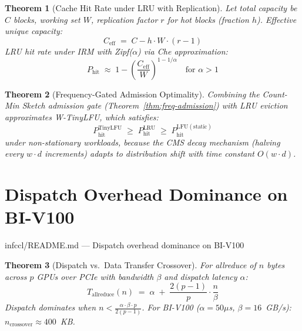\documentclass[11pt,a4paper,twoside]{article}
\theoremstyle{plain}
\newtheorem{theorem}{Theorem}[section]
\theoremstyle{definition}
\theoremstyle{remark}
\begin{document}
\begin{theorem}[Cache Hit Rate under LRU with Replication]
\label{thm:cache-hit}
Let total capacity be $C$ blocks, working set $W$, replication factor $r$ for hot
blocks (fraction $h$).  Effective unique capacity:
\begin{equation}
  C_{\text{eff}} \;=\; C - h \cdot W \cdot (r - 1)
\end{equation}
LRU hit rate under IRM with Zipf($\alpha$) via Che approximation:
\begin{equation}
  P_{\text{hit}} \;\approx\; 1 - \left(\frac{C_{\text{eff}}}{W}\right)^{1-1/\alpha}
  \quad\text{for } \alpha > 1
\end{equation}
\end{theorem}

\begin{theorem}[Frequency-Gated Admission Optimality]
\label{thm:freq-gated}
Combining the Count-Min Sketch admission gate (Theorem~\ref{thm:freq-admission})
with LRU eviction approximates W-TinyLFU, which satisfies:
\begin{equation}
  P_{\text{hit}}^{\text{TinyLFU}} \;\geq\; P_{\text{hit}}^{\text{LRU}}
  \;\geq\; P_{\text{hit}}^{\text{LFU}(\text{static})}
\end{equation}
under non-stationary workloads, because the CMS decay mechanism (halving every
$w \cdot d$ increments) adapts to distribution shift with time constant $O(w \cdot d)$.
\end{theorem}


\section{Dispatch Overhead Dominance on BI-V100}
\label{sec:dispatch}

\begin{commitbox}{infccl/README.md --- Dispatch overhead dominance on BI-V100}
\end{commitbox}

\begin{theorem}[Dispatch vs.\ Data Transfer Crossover]
\label{thm:dispatch-dominance}
For allreduce of $n$ bytes across $p$ GPUs over PCIe with bandwidth $\beta$ and
dispatch latency $\alpha$:
\begin{equation}
  T_{\text{allreduce}}(n) \;=\; \alpha \;+\; \frac{2(p-1)}{p} \cdot \frac{n}{\beta}
\end{equation}
Dispatch dominates when $n < \frac{\alpha \cdot \beta \cdot p}{2(p-1)}$.
For BI-V100 ($\alpha = 50\mu$s, $\beta = 16$~GB/s): $n_{\text{crossover}} \approx 400$~KB.
\end{theorem}
\end{document}
